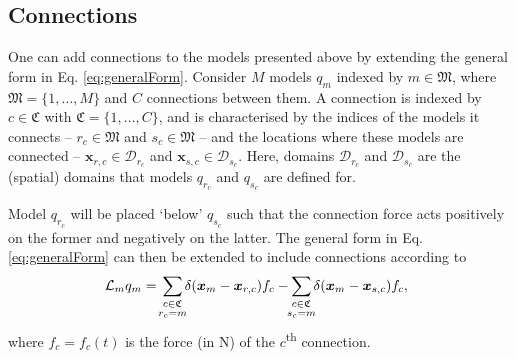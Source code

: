 \documentclass{article}
\begin{document}
\subsection{Connections}\label{sec:contConnections}


One can add connections to the models presented above by extending the general form in Eq. \eqref{eq:generalForm}. Consider $M$ models $q_m$ indexed by $m \in \mathfrak{M}$, where $\mathfrak{M} = \{1, \hdots, M\}$ and $C$ connections between them. A connection is indexed by $c\in \mathfrak{C}$ with $\mathfrak{C} = \{1, \hdots, C\}$, and is characterised by the indices of the models it connects -- $r_c \in \mathfrak{M}$ and $s_c\in \mathfrak{M}$ -- and the locations where these models are connected -- $\boldsymbol{x}_{r, c}\in \mathcal{D}_{r_c}$ and $\boldsymbol{x}_{s, c}\in \mathcal{D}_{s_c}$. Here, domains $\mathcal{D}_{r_c}$ and $\mathcal{D}_{s_c}$ are the (spatial) domains that models $q_{r_c}$ and $q_{s_c}$ are defined for.  

Model $q_{r_c}$ will be placed `below' $q_{s_c}$ such that the connection force acts positively on the former and negatively on the latter. The general form in Eq. \eqref{eq:generalForm} can then be extended to include connections according to
\begin{equation}\label{eq:generalFormConnections}
    \!\!\!\mathcal{L}_mq_m =\!\sum_{\substack{c\in \mathfrak{C}\vspace{0.1em}\\ r_c = m}}\!\! \delta(\boldsymbol{x}_m - \boldsymbol{x}_{r, c}) f_c-\!\! \sum_{\substack{c\in \mathfrak{C}\vspace{0.1em}\\ s_c = m}}\!\! \delta(\boldsymbol{x}_m - \boldsymbol{x}_{s,c}) f_c,
\end{equation}
where $f_c = f_c(t)$ is the force (in N) of the $c$\textsuperscript{th} connection.
\end{document}
